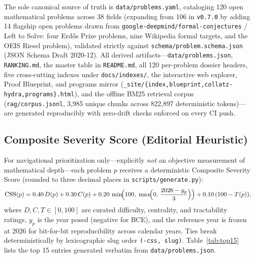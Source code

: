 \documentclass[11pt,reqno]{amsart}
\theoremstyle{plain}
\theoremstyle{definition}
\newcommand{\code}[1]{{\upshape\nolinkurl{#1}}}
\begin{document}
The sole canonical source of truth is \code{data/problems.yaml}, cataloging 120 open
mathematical problems across 38 fields (expanding from 106 in \texttt{v0.7.0} by adding 14
flagship open problems drawn from \code{google-deepmind/formal-conjectures} / Left to Solve:
four Erd\H{o}s Prize problems, nine Wikipedia formal targets, and the OEIS Riesel problem),
validated strictly against \code{schema/problem.schema.json} (JSON Schema Draft 2020-12). All
derived artifacts---\code{data/problems.json}, \code{RANKING.md}, the master table in
\code{README.md}, all 120 per-problem dossier headers, five cross-cutting indexes under
\code{docs/indexes/}, the interactive web explorer, Proof Blueprint, and programs mirror
(\code{_site/{index,blueprint,collatz-hydra,programs}.html}), and the offline BM25 retrieval corpus
(\code{rag/corpus.jsonl}, 3,985 unique chunks across 822,897 deterministic tokens)---are
generated reproducibly with zero-drift checks enforced on every CI push.

\subsection{Composite Severity Score (Editorial Heuristic)}
For navigational prioritization only---explicitly \emph{not} an objective measurement of
mathematical depth---each problem $p$ receives a deterministic Composite Severity Score
(rounded to three decimal places in \code{scripts/generate.py}):
\begin{equation}\label{eq:css}
  \mathrm{CSS}(p) = 0.40\,D(p) + 0.30\,C(p)
    + 0.20\,\min\!\Bigl(100,\;\max\!\Bigl(0,\,\frac{2026 - y_p}{3}\Bigr)\Bigr)
    + 0.10\,(100 - T(p)),
\end{equation}
where $D, C, T \in [0,100]$ are curated difficulty, centrality, and tractability ratings,
$y_p$ is the year posed (negative for BCE), and the reference year is frozen at $2026$ for
bit-for-bit reproducibility across calendar years. Ties break deterministically by lexicographic
slug order \code{(-css, slug)}. Table~\ref{tab:top15} lists the top 15 entries generated
verbatim from \code{data/problems.json}.
\end{document}
